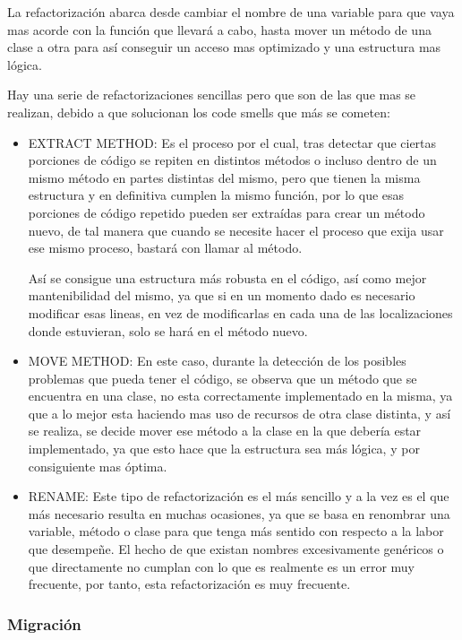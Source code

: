La refactorización abarca desde cambiar el nombre de una variable para que vaya mas acorde con la función que llevará a cabo, hasta mover un método de una clase a otra para así conseguir un acceso mas optimizado y una estructura mas lógica.

Hay una serie de refactorizaciones sencillas pero que son de las que mas se realizan, debido a que solucionan los code smells que más se cometen:
\begin{itemize}
\item EXTRACT METHOD: Es el proceso por el cual, tras detectar que ciertas porciones de código se repiten en distintos métodos o incluso dentro de un mismo método en partes distintas del mismo, pero que tienen la misma estructura y en definitiva cumplen la mismo función, por lo que esas porciones de código repetido pueden ser extraídas para crear un método nuevo, de tal manera que cuando se necesite hacer el proceso que exija usar ese mismo proceso, bastará con llamar al método. 

Así se consigue una estructura más robusta en el código, así como mejor mantenibilidad del mismo, ya que si en un momento dado es necesario modificar esas lineas, en vez de modificarlas en cada una de las localizaciones donde estuvieran, solo se hará en el método nuevo.

\item MOVE METHOD: En este caso, durante la detección de los posibles problemas que pueda tener el código, se observa que un método que se encuentra en una clase, no esta correctamente implementado en la misma, ya que a lo mejor esta haciendo mas uso de recursos de otra clase distinta, y así se realiza, se decide mover ese método a la clase en la que debería estar implementado, ya que esto hace que la estructura sea más lógica, y por consiguiente mas óptima.

\item RENAME: Este tipo de refactorización es el más sencillo y a la vez es el que más necesario resulta en muchas ocasiones, ya que se basa en renombrar una variable, método o clase para que tenga más sentido con respecto a la labor que desempeñe. El hecho de que existan nombres excesivamente genéricos o que directamente no cumplan con lo que es realmente es un error muy frecuente, por tanto, esta refactorización es muy frecuente.
\end{itemize}

\subsubsection{Migración}

